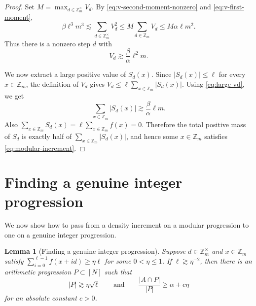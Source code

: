 \documentclass[11pt]{amsart}
\newcommand{\Z}{\mathbb{Z}}
\newcommand{\abs}[1]{\lvert#1\rvert}
\numberwithin{equation}{section}
\theoremstyle{plain}
\newtheorem{lemma}[theorem]{Lemma}
\theoremstyle{remark}
\begin{document}
\begin{proof}
Set $M=\max_{d\in\Z_m^\times}V_d$. By \eqref{eq:v-second-moment-nonzero} and
\eqref{eq:v-first-moment},
$$
\beta\ell^3m^3\lesssim \sum_{d\in\Z_m^\times}V_d^2
\leq M\sum_{d\in\Z_m}V_d\leq M\alpha\ell m^2.
$$
Thus there is a nonzero step $d$ with
\begin{equation}\label{eq:large-vd}
V_d\gtrsim \frac{\beta}{\alpha}\ell^2m.
\end{equation}

We now extract a large positive value of $S_d(x)$. Since $\abs{S_d(x)}\leq\ell$
for every $x\in\Z_m$, the definition of $V_d$ gives
$V_d\leq \ell\sum_{x\in\Z_m}\abs{S_d(x)}$. Using \eqref{eq:large-vd}, we get
$$
\sum_{x\in\Z_m}\abs{S_d(x)}\gtrsim \frac{\beta}{\alpha}\ell m.
$$
Also $\sum_{x\in\Z_m}S_d(x)=\ell\sum_{x\in\Z_m}f(x)=0$. Therefore the total
positive mass of $S_d$ is exactly half of $\sum_{x\in\Z_m}\abs{S_d(x)}$, and
hence some $x\in\Z_m$ satisfies \eqref{eq:modular-increment}.
\end{proof}

\section{Finding a genuine integer progression}

We now show how to pass from a density increment on a modular progression to
one on a genuine integer progression.

\begin{lemma}[Finding a genuine integer progression]\label{lem:rect}
Suppose $d\in\Z_m^\times$ and $x\in\Z_m$ satisfy
$\sum_{i=0}^{\ell-1}f(x+id)\geq\eta\ell$ for some $0<\eta\leq1$. If
$\ell\gtrsim\eta^{-2}$, then there is an arithmetic progression $P\subset[N]$
such that
$$
\abs{P}\gtrsim\eta\sqrt{\ell}
\qquad\text{and}\qquad
\frac{\abs{A\cap P}}{\abs{P}}\geq\alpha+c\eta
$$
for an absolute constant $c>0$.
\end{lemma}
\end{document}
